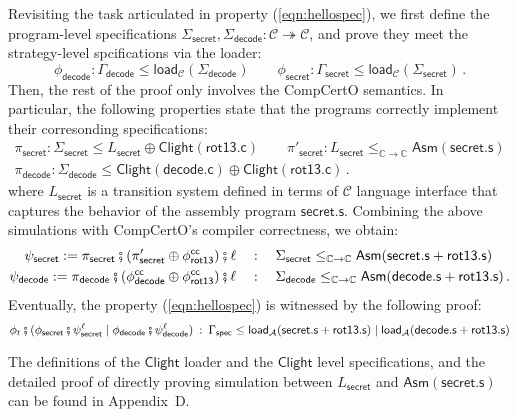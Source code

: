\documentclass[acmsmall,screen,review,anonymous,nonacm]{acmart}
\newcommand{\kw}[1]{\ensuremath{ \mathsf{#1} }}
\begin{document}
\begin{example}
Revisiting
the task articulated in property (\ref{eqn:hellospec}),
we first
define the
program-level specifications
$\Sigma_\kw{secret}, \Sigma_\kw{decode} :
\mathcal{C} \twoheadrightarrow \mathcal{C}$,
and prove
they meet
the strategy-level spcifications
via the loader:
\[
  \phi_\kw{decode}: \Gamma_\kw{decode} \le \kw{load}_\mathcal{C}(\Sigma_\kw{decode})
  \qquad
  \phi_\kw{secret}: \Gamma_\kw{secret} \le \kw{load}_\mathcal{C}(\Sigma_\kw{secret})
  \,.
\]%
Then, the rest of the proof
only involves the CompCertO semantics.
In particular,
the following properties
state that
the programs correctly implement
their corresonding specifications:
\begin{gather*}
  \pi_\kw{secret}: \Sigma_\kw{secret} \le L_\kw{secret} \oplus \kw{Clight}(\kw{rot13.c})
  \qquad
  \pi'_\kw{secret}: L_\kw{secret} \le_{\mathbb{C} \rightarrow \mathbb{C}} \kw{Asm}(\kw{secret.s})
  \\
  \pi_\kw{decode}: \Sigma_\kw{decode} \le \kw{Clight}(\kw{decode.c}) \oplus \kw{Clight}(\kw{rot13.c})
  \,.
\end{gather*}
where $L_\kw{secret}$
is a transition system
defined in terms of $\mathcal{C}$ language interface
that captures the behavior of
the assembly program $\kw{secret.s}$.
Combining the above simulations
with CompCertO's compiler correctness,
we obtain:
\begin{align*}
   \psi_\kw{secret} := \pi_\kw{secret} \fatsemi
  (\pi'_\kw{secret} \oplus \phi^\kw{cc}_\kw{rot13})
  \fatsemi \ell
  & \quad :\quad \Sigma_\kw{secret} \le_{\mathbb{C} \rightarrow \mathbb{C}}
  \kw{Asm}(\kw{secret.s} + \kw{rot13.s}) \\
   \psi_\kw{decode} := \pi_\kw{decode} \fatsemi
  (\phi^\kw{cc}_\kw{decode} \oplus \phi^\kw{cc}_\kw{rot13})
  \fatsemi \ell
  & \quad :\quad \Sigma_\kw{decode} \le_{\mathbb{C} \rightarrow \mathbb{C}}
  \kw{Asm}(\kw{decode.s} + \kw{rot13.s})
  \,.
\end{align*}
Eventually,
the property (\ref{eqn:hellospec})
is witnessed by the following proof:
\[
 \phi_t \fatsemi
 (\phi_\kw{secret} \fatsemi \psi_\kw{secret}^\ell \mid
 \phi_\kw{decode} \fatsemi \psi_\kw{decode}^\ell) \: : \:
 \Gamma_\kw{spec} \le \kw{load}_\mathcal{A}(\kw{secret.s} + \kw{rot13.s})
 \mid \kw{load}_\mathcal{A}(\kw{decode.s} + \kw{rot13.s})
\]
\end{example}%
The definitions of
the $\kw{Clight}$ loader and
the $\kw{Clight}$ level specifications,
and the detailed proof
of directly proving simulation
between $L_\kw{secret}$ and $\kw{Asm}(\kw{secret.s})$
can be found in Appendix~D.
\end{document}
